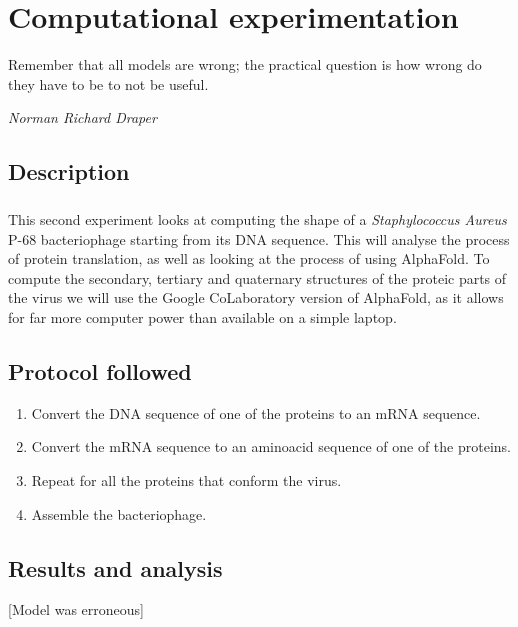 \chapter{Computational experimentation}
\epigraph{Remember that all models are wrong; the practical question is how wrong do they have to be to not be useful.}{\textit{Norman Richard Draper}}
\section{Description}
\paragraph{}This second experiment looks at computing the shape of a \emph{Staphylococcus Aureus} P-68 bacteriophage starting from its DNA sequence. This will analyse the process of protein translation, as well as looking at the process of using AlphaFold\cite{jumperHighlyAccurateProtein2021}. To compute the secondary, tertiary and quaternary structures of the proteic parts of the virus we will use the Google CoLaboratory version of AlphaFold\cite{GoogleColaboratoryAlpha1970}, as it allows for far more computer power than available on a simple laptop.
\section{Protocol followed}
\begin{enumerate}[label=\arabic*)]
\item Convert the DNA sequence of one of the proteins to an mRNA sequence.
\item Convert the mRNA sequence to an aminoacid sequence of one of the proteins.
\item Repeat for all the proteins that conform the virus.
\item Assemble the bacteriophage.
\end{enumerate}
\section{Results and analysis}
[Model was erroneous]